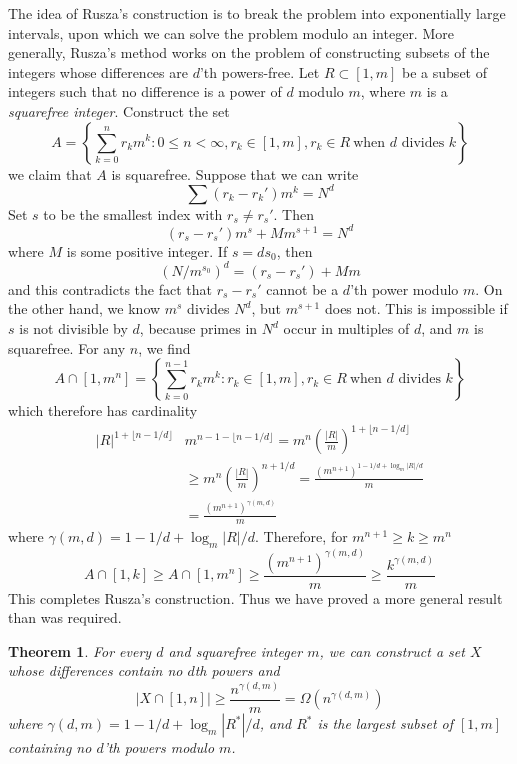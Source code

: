 \documentclass{article}
\theoremstyle{plain}
\theoremstyle{plain}
\newtheorem{theorem}{Theorem}
\begin{document}
The idea of Rusza's construction is to break the problem into exponentially large intervals, upon which we can solve the problem modulo an integer. More generally, Rusza's method works on the problem of constructing subsets of the integers whose differences are $d$'th powers-free. Let $R \subset [1,m]$ be a subset of integers such that no difference is a power of $d$ modulo $m$, where $m$ is a {\it squarefree integer}. Construct the set
%
\[ A = \left\{ \sum_{k = 0}^n r_k m^k : 0 \leq n < \infty, r_k \in [1,m], r_k \in R\ \text{when $d$ divides $k$} \right\} \]
%
we claim that $A$ is squarefree. Suppose that we can write
%
\[ \sum (r_k - r_k') m^k = N^d \]
%
Set $s$ to be the smallest index with $r_s \neq r_s'$. Then
%
\[ (r_s - r_s') m^s + M m^{s+1} = N^d \]
%
where $M$ is some positive integer. If $s = ds_0$, then
%
\[ (N/m^{s_0})^d = (r_s - r_s') + M m \]
%
and this contradicts the fact that $r_s - r_s'$ cannot be a $d$'th power modulo $m$. On the other hand, we know $m^s$ divides $N^d$, but $m^{s+1}$ does not. This is impossible if $s$ is not divisible by $d$, because primes in $N^d$ occur in multiples of $d$, and $m$ is squarefree. For any $n$, we find
%
\[ A \cap [1,m^n] = \left\{ \sum_{k = 0}^{n-1} r_km^k : r_k \in [1,m], r_k \in R\ \text{when $d$ divides $k$} \right\} \]
%
which therefore has cardinality
%
\begin{align*}
    |R|^{1 + \lfloor n-1/d \rfloor}& m^{n-1- \lfloor n-1/d \rfloor} = m^n \left( \frac{|R|}{m} \right)^{1 + \lfloor n-1/d \rfloor}\\
    &\geq m^n \left( \frac{|R|}{m} \right)^{n+1/d} = \frac{(m^{n+1})^{1 - 1/d + \log_m |R|/d}}{m}\\
    &= \frac{(m^{n+1})^{\gamma(m,d)}}{m}
\end{align*}
%
where $\gamma(m,d) = 1 - 1/d + \log_m |R|/d$. Therefore, for $m^{n+1} \geq k \geq m^n$
%
\[ A \cap [1,k] \geq A \cap [1,m^n] \geq \frac{(m^{n+1})^{\gamma(m,d)}}{m} \geq \frac{k^{\gamma(m,d)}}{m} \]
%
This completes Rusza's construction. Thus we have proved a more general result than was required.

\begin{theorem}
    For every $d$ and squarefree integer $m$, we can construct a set $X$ whose differences contain no $d$th powers and
    \[ |X \cap [1,n]| \geq \frac{n^{\gamma(d,m)}}{m} = \Omega(n^{\gamma(d,m)}) \]
    where $\gamma(d,m) = 1 - 1/d + \log_m |R^*|/d$, and $R^*$ is the largest subset of $[1,m]$ containing no $d$'th powers modulo $m$.
\end{theorem}
\end{document}
